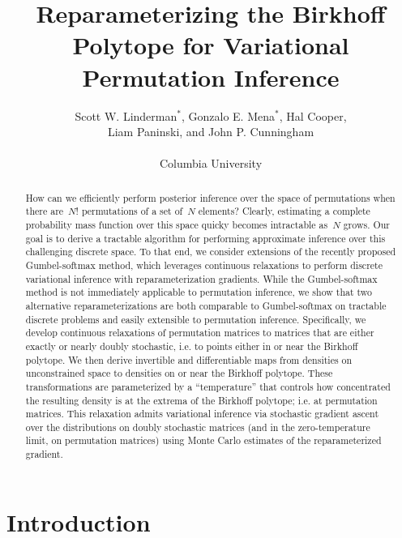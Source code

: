 



\title{Reparameterizing the Birkhoff Polytope for Variational Permutation Inference}
\author{
  Scott W. Linderman$^*$, Gonzalo E. Mena$^*$, Hal Cooper, \\
  Liam Paninski, and John P. Cunningham\\
  \\
  Columbia University
}


\maketitle

\begin{abstract}
  How can we efficiently perform posterior inference over the space
  of permutations when there are~$N!$ permutations of a set of~$N$
  elements?  Clearly, estimating a complete probability mass function
  over this space quicky becomes intractable as~$N$ grows. Our goal is
  to derive a tractable algorithm for performing approximate inference
  over this challenging discrete space.  To that end, we consider
  extensions of the recently proposed Gumbel-softmax method, which
  leverages continuous relaxations to perform discrete variational
  inference with reparameterization gradients. While the
  Gumbel-softmax method is not immediately applicable to permutation
  inference, we show that two alternative reparameterizations are both
  comparable to Gumbel-softmax on tractable discrete problems and
  easily extensible to permutation inference. Specifically, we develop
  continuous relaxations of permutation matrices to matrices that are
  either exactly or nearly doubly stochastic, i.e. to points either in
  or near the Birkhoff polytope.  We then derive invertible and
  differentiable maps from densities on unconstrained space to
  densities on or near the Birkhoff polytope. These transformations
  are parameterized by a ``temperature'' that controls how
  concentrated the resulting density is at the extrema of the Birkhoff
  polytope; i.e. at permutation matrices.  This relaxation admits
  variational inference via stochastic gradient ascent over the
  distributions on doubly stochastic matrices (and in the
  zero-temperature limit, on permutation matrices) using Monte Carlo
  estimates of the reparameterized gradient.
\end{abstract}

\section{Introduction}

